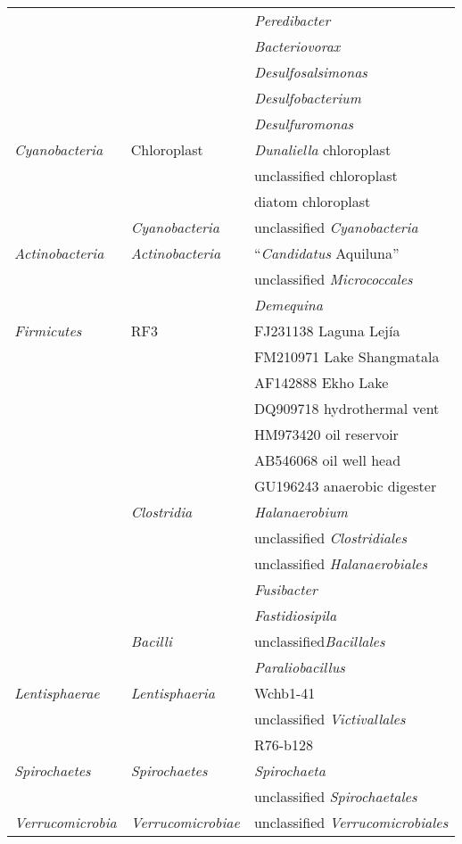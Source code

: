 \begin{longtable}{p{2.5cm}p{4cm}p{7cm}}
 &  & \emph{Peredibacter} \\
 &  & \emph{Bacteriovorax} \\
 &  & \emph{Desulfosalsimonas} \\
 &  & \emph{Desulfobacterium} \\
 &  & \emph{Desulfuromonas} \\
\emph{Cyanobacteria} & Chloroplast & \emph{Dunaliella} chloroplast \\
 &  & unclassified chloroplast \\
 &  & diatom chloroplast \\
 & \emph{Cyanobacteria} & unclassified \emph{Cyanobacteria} \\
\emph{Actinobacteria} & \emph{Actinobacteria} & ``\emph{Candidatus} Aquiluna'' \\
 &  & unclassified \emph{Micrococcales} \\
 &  & \emph{Demequina} \\
\emph{Firmicutes} & RF3 & FJ231138 Laguna Lej\'{i}a \\
 &  & FM210971 Lake Shangmatala \\
 &  & AF142888 Ekho Lake  \\
 &  & DQ909718 hydrothermal vent  \\
 &  & HM973420 oil reservoir  \\
 &  & AB546068 oil well head  \\
 &  & GU196243 anaerobic digester \\
 & \emph{Clostridia} & \emph{Halanaerobium} \\
 &  & unclassified \emph{Clostridiales} \\
 &  & unclassified \emph{Halanaerobiales} \\
 &  & \emph{Fusibacter} \\
 &  & \emph{Fastidiosipila} \\
 & \emph{Bacilli} & unclassified\emph{Bacillales} \\
 &  & \emph{Paraliobacillus} \\
\emph{Lentisphaerae}  & \emph{Lentisphaeria} & Wchb1-41 \\
 &  & unclassified \emph{Victivallales} \\
 &  & R76-b128 \\
\emph{Spirochaetes} & \emph{Spirochaetes} & \emph{Spirochaeta} \\
 &  & unclassified \emph{Spirochaetales} \\
\emph{Verrucomicrobia} & \emph{Verrucomicrobiae} & unclassified \emph{Verrucomicrobiales} \\

\end{longtable}
